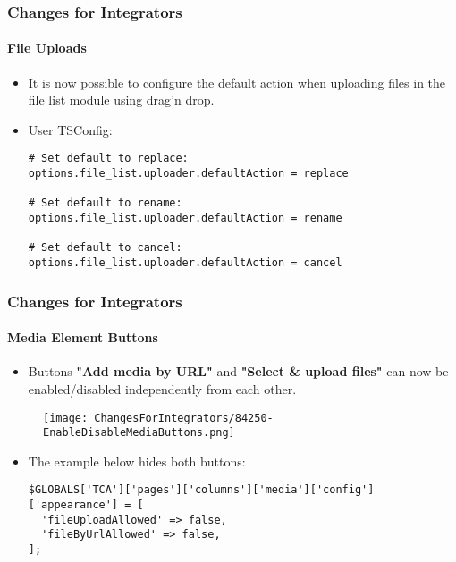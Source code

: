
\begin{frame}[fragile]
	\frametitle{Changes for Integrators}
	\framesubtitle{File Uploads}

	\lstset{basicstyle=\smaller\ttfamily}

	\begin{itemize}
		\item It is now possible to configure the default action when uploading files in the file list module using drag'n drop.
		\item User TSConfig:

\begin{lstlisting}
# Set default to replace:
options.file_list.uploader.defaultAction = replace

# Set default to rename:
options.file_list.uploader.defaultAction = rename

# Set default to cancel:
options.file_list.uploader.defaultAction = cancel
\end{lstlisting}

	\end{itemize}

\end{frame}


\begin{frame}[fragile]
	\frametitle{Changes for Integrators}
	\framesubtitle{Media Element Buttons}

	\lstset{basicstyle=\tiny\ttfamily}

	\begin{itemize}
		\item Buttons \textbf{"Add media by URL"} and \textbf{"Select \& upload files"}
			can now be enabled/disabled independently from each other.
	\end{itemize}

	\begin{figure}
		\texttt{[image: ChangesForIntegrators/84250-EnableDisableMediaButtons.png]}
	\end{figure}

	\begin{itemize}
		\item The example below hides both buttons:

\begin{lstlisting}
$GLOBALS['TCA']['pages']['columns']['media']['config']['appearance'] = [
  'fileUploadAllowed' => false,
  'fileByUrlAllowed' => false,
];
\end{lstlisting}

	\end{itemize}

\end{frame}

